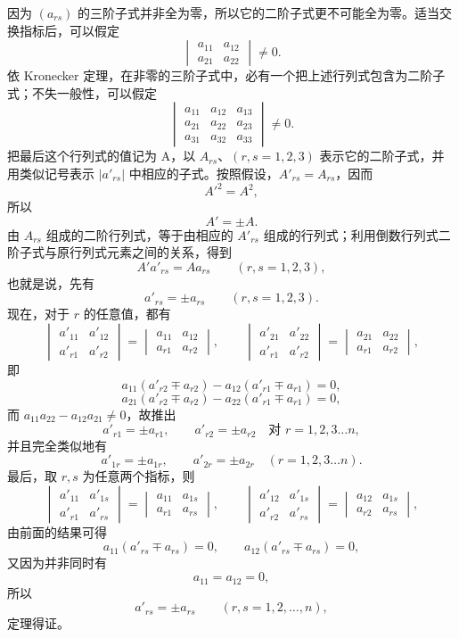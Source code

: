 因为 $(a_{rs})$ 的三阶子式并非全为零，所以它的二阶子式更不可能全为零。适当交换指标后，可以假定
\[
\begin{vmatrix}
a_{11}&a_{12}\\
a_{21}&a_{22}
\end{vmatrix}\ne0.
\]
依 Kronecker 定理，在非零的三阶子式中，必有一个把上述行列式包含为二阶子式；不失一般性，可以假定
\[
\begin{vmatrix}
a_{11}&a_{12}&a_{13}\\
a_{21}&a_{22}&a_{23}\\
a_{31}&a_{32}&a_{33}
\end{vmatrix}\ne0.
\]
把最后这个行列式的值记为 A，以 $A_{rs}$、$(r,s=1,2,3)$ 表示它的二阶子式，并用类似记号表示 $|a'_{rs}|$ 中相应的子式。按照假设，$A'_{rs}=A_{rs}$，因而
\[
{A'}^2=A^2,
\]
所以
\[
A'=\pm A.
\]
由 $A_{rs}$ 组成的二阶行列式，等于由相应的 $A'_{rs}$ 组成的行列式；利用倒数行列式二阶子式与原行列式元素之间的关系，得到
\[
A'a'_{rs}=Aa_{rs}\qquad (r,s=1,2,3),
\]
也就是说，先有
\[
a'_{rs}=\pm a_{rs}\qquad (r,s=1,2,3).
\]
现在，对于 $r$ 的任意值，都有
\[
\begin{vmatrix}
a'_{11}&a'_{12}\\
a'_{r1}&a'_{r2}
\end{vmatrix}
=
\begin{vmatrix}
a_{11}&a_{12}\\
a_{r1}&a_{r2}
\end{vmatrix},
\qquad
\begin{vmatrix}
a'_{21}&a'_{22}\\
a'_{r1}&a'_{r2}
\end{vmatrix}
=
\begin{vmatrix}
a_{21}&a_{22}\\
a_{r1}&a_{r2}
\end{vmatrix},
\]
即
\[
a_{11}(a'_{r2}\mp a_{r2})-a_{12}(a'_{r1}\mp a_{r1})=0,
\]
\[
a_{21}(a'_{r2}\mp a_{r2})-a_{22}(a'_{r1}\mp a_{r1})=0,
\]
而 $a_{11}a_{22}-a_{12}a_{21}\ne0$，故推出
\[
a'_{r1}=\pm a_{r1},\qquad a'_{r2}=\pm a_{r2}\quad \text{对 } r=1,2,3\ldots n,
\]
并且完全类似地有
\[
a'_{1r}=\pm a_{1r},\qquad a'_{2r}=\pm a_{2r}\quad (r=1,2,3\ldots n).
\]
最后，取 $r,s$ 为任意两个指标，则
\[
\begin{vmatrix}
a'_{11}&a'_{1s}\\
a'_{r1}&a'_{rs}
\end{vmatrix}
=
\begin{vmatrix}
a_{11}&a_{1s}\\
a_{r1}&a_{rs}
\end{vmatrix},
\qquad
\begin{vmatrix}
a'_{12}&a'_{1s}\\
a'_{r2}&a'_{rs}
\end{vmatrix}
=
\begin{vmatrix}
a_{12}&a_{1s}\\
a_{r2}&a_{rs}
\end{vmatrix},
\]
由前面的结果可得
\[
a_{11}(a'_{rs}\mp a_{rs})=0,\qquad
a_{12}(a'_{rs}\mp a_{rs})=0,
\]
又因为并非同时有
\[
a_{11}=a_{12}=0,
\]
所以
\[
a'_{rs}=\pm a_{rs}\qquad (r,s=1,2,\ldots,n),
\]
定理得证。


